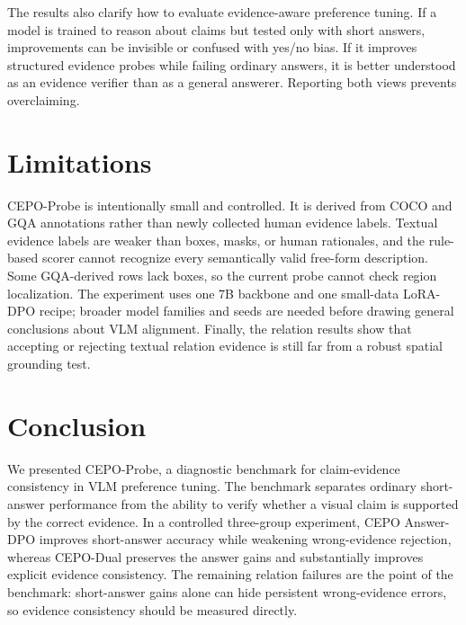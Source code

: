 \documentclass[10pt,twocolumn,letterpaper]{article}
\newcommand{\benchmark}{CEPO-Probe}
\newcommand{\answerdpo}{CEPO Answer-DPO}
\newcommand{\cepodual}{CEPO-Dual}
\begin{document}
The results also clarify how to evaluate evidence-aware preference tuning. If
a model is trained to reason about claims but tested only with short answers,
improvements can be invisible or confused with yes/no bias. If it improves
structured evidence probes while failing ordinary answers, it is better
understood as an evidence verifier than as a general answerer. Reporting both
views prevents overclaiming.

\section{Limitations}

\benchmark{} is intentionally small and controlled. It is derived from COCO
and GQA annotations rather than newly collected human evidence labels. Textual
evidence labels are weaker than boxes, masks, or human rationales, and the
rule-based scorer cannot recognize every semantically valid free-form
description. Some GQA-derived rows lack boxes, so the current probe cannot
check region localization. The experiment uses one 7B backbone and one
small-data LoRA-DPO recipe; broader model families and seeds are needed before
drawing general conclusions about VLM alignment. Finally, the relation results
show that accepting or rejecting textual relation evidence is still far from a
robust spatial grounding test.

\section{Conclusion}

We presented \benchmark{}, a diagnostic benchmark for claim-evidence
consistency in VLM preference tuning. The benchmark separates ordinary
short-answer performance from the ability to verify whether a visual claim is
supported by the correct evidence. In a controlled three-group experiment,
\answerdpo{} improves short-answer accuracy while weakening wrong-evidence
rejection, whereas \cepodual{} preserves the answer gains and substantially
improves explicit evidence consistency. The remaining relation failures are
the point of the benchmark: short-answer gains alone can hide persistent
wrong-evidence errors, so evidence consistency should be measured directly.

{
    \small
    
    
}

\ifdefined\cvprincludeappendix
  \clearpage
  \appendix
  
\fi
\end{document}

